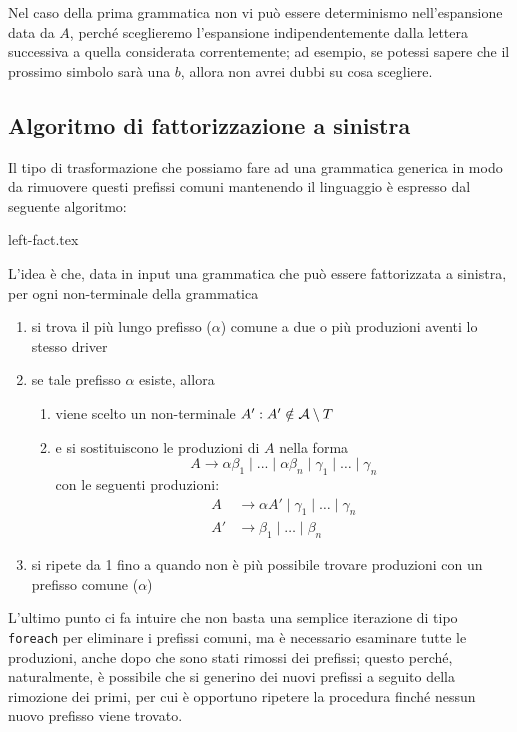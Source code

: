\documentclass[class=book, crop=false, oneside, 12pt]{standalone}
\begin{document}
Nel caso della prima grammatica non vi può essere determinismo nell'espansione data da \(A\), perché sceglieremo l'espansione indipendentemente dalla lettera successiva a quella considerata correntemente; ad esempio, se potessi sapere che il prossimo simbolo sarà una \(b\), allora non avrei dubbi su cosa scegliere.

\subsection{Algoritmo di fattorizzazione a sinistra}
Il tipo di trasformazione che possiamo fare ad una grammatica generica in modo da rimuovere questi prefissi comuni mantenendo il linguaggio è espresso dal seguente algoritmo: 

{left-fact.tex}

L'idea è che, data in input una grammatica che può essere fattorizzata a sinistra, per ogni non-terminale della grammatica
\begin{enumerate}
	\item si trova il più lungo prefisso (\(\alpha\)) comune a due o più produzioni aventi lo stesso driver
	\item se tale prefisso \(\alpha\) esiste, allora
	\begin{enumerate}
		\item viene scelto un non-terminale \(A' : A' \notin \mathcal{A} \setminus T\)
		\item e si sostituiscono le produzioni di \(A\) nella forma
		\begin{equation*}
    			A \rightarrow \alpha \beta_1 \mid ... \mid \alpha \beta_n \mid \gamma_1 \mid \ldots \mid \gamma_n
		\end{equation*}
		con le seguenti produzioni: 
		\begin{align*}
    			A &\rightarrow \alpha A' \mid \gamma_1 \mid \ldots \mid \gamma_n \\
    			A' &\rightarrow \beta_1 \mid \ldots \mid \beta_n
		\end{align*}
	\end{enumerate} 
	\item si ripete da 1 fino a quando non è più possibile trovare produzioni con un prefisso comune (\(\alpha\))
\end{enumerate}

L'ultimo punto ci fa intuire che non basta una semplice iterazione di tipo \texttt{foreach} per eliminare i prefissi comuni, ma è necessario esaminare tutte le produzioni, anche dopo che sono stati rimossi dei prefissi; questo perché, naturalmente, è possibile che si generino dei nuovi prefissi a seguito della rimozione dei primi, per cui è opportuno ripetere la procedura finché nessun nuovo prefisso viene trovato.
\end{document}
